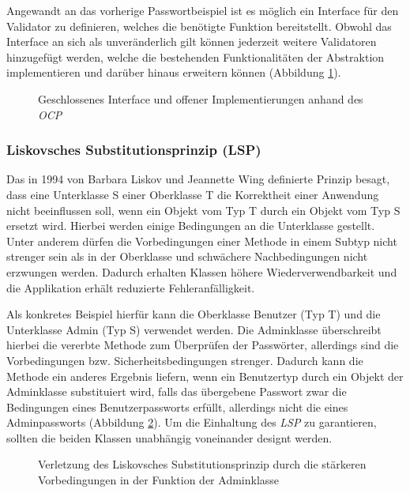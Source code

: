 \documentclass[conference]{IEEEtran}
\begin{document}
Angewandt an das vorherige Passwortbeispiel ist es möglich ein Interface für den Validator zu definieren, welches die benötigte Funktion bereitstellt. Obwohl das Interface an sich als unveränderlich gilt können jederzeit weitere Validatoren hinzugefügt werden, welche die bestehenden Funktionalitäten der Abstraktion implementieren und darüber hinaus erweitern können (Abbildung \ref{fig:OCP}). 

\begin{figure}[htbp]
	\small
	
	\caption{Geschlossenes Interface und offener Implementierungen anhand des \emph{OCP}}
	\label{fig:OCP}
\end{figure}



\subsubsection{Liskovsches Substitutionsprinzip (LSP)} Das in 1994 von Barbara Liskov und Jeannette Wing definierte Prinzip besagt, dass eine Unterklasse S einer Oberklasse T die Korrektheit einer Anwendung nicht beeinflussen soll, wenn ein Objekt vom Typ T durch ein Objekt vom Typ S ersetzt wird. Hierbei werden einige Bedingungen an die Unterklasse gestellt. Unter anderem dürfen die Vorbedingungen einer Methode in einem Subtyp nicht strenger sein als in der Oberklasse und schwächere Nachbedingungen nicht erzwungen werden. Dadurch erhalten Klassen höhere Wiederverwendbarkeit und die Applikation erhält reduzierte Fehleranfälligkeit. \cite{Leavens.2000} \cite{Martin.2018}

Als konkretes Beispiel hierfür kann die Oberklasse Benutzer (Typ T) und die Unterklasse Admin (Typ S) verwendet werden. Die Adminklasse überschreibt hierbei die vererbte Methode zum Überprüfen der Passwörter, allerdings sind die Vorbedingungen bzw. Sicherheitsbedingungen strenger. Dadurch kann die Methode ein anderes Ergebnis liefern, wenn ein Benutzertyp durch ein Objekt der Adminklasse substituiert wird, falls das übergebene Passwort zwar die Bedingungen eines Benutzerpassworts erfüllt, allerdings nicht die eines Adminpassworts (Abbildung \ref{fig:VorLSP}). Um die Einhaltung des \emph{LSP} zu garantieren, sollten die beiden Klassen unabhängig voneinander designt werden.


\begin{figure}[htbp]
	\small
	
	\caption{Verletzung des Liskovsches Substitutionsprinzip durch die stärkeren Vorbedingungen in der Funktion der Adminklasse }
	\label{fig:VorLSP}
\end{figure}
\end{document}
